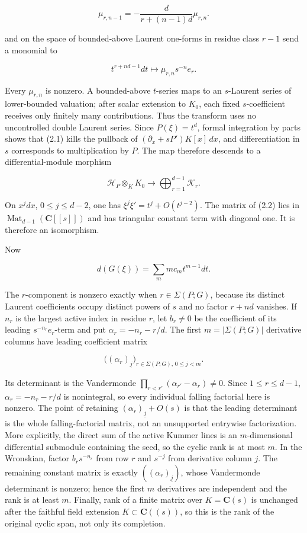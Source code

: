 \documentclass[
  11pt,
  a4paper,
]{amsart}
\begin{document}
\[
\mu_{r,n-1}=-\frac d{r+(n-1)d}\mu_{r,n}.
\]

and on the space of bounded-above Laurent one-forms in residue class
\(r-1\) send a monomial to

\[
t^{r+nd-1}dt\longmapsto\mu_{r,n}s^{-n}e_r.              \tag{2.1}
\]

Every \(\mu_{r,n}\) is nonzero. A bounded-above \(t\)-series maps to an
\(s\)-Laurent series of lower-bounded valuation; after scalar extension
to \(K_0\), each fixed \(s\)-coefficient receives only finitely many
contributions. Thus the transform uses no uncontrolled double Laurent
series. Since \(P(\xi)=t^d\), formal integration by parts shows that
(2.1) kills the pullback of \((\partial_x+sP')K[x]\,dx\), and
differentiation in \(s\) corresponds to multiplication by \(P\). The map
therefore descends to a differential-module morphism

\[
\mathcal H_P\otimes_KK_0
\longrightarrow\bigoplus_{r=1}^{d-1}\mathcal K_r.       \tag{2.2}
\]

On \(x^jdx\), \(0\le j\le d-2\), one has \(\xi^j\xi'=t^j+O(t^{j-2})\).
The matrix of (2.2) lies in \(\operatorname{Mat}_{d-1}(\mathbf C[[s]])\)
and has triangular constant term with diagonal one. It is therefore an
isomorphism.

Now

\[
d(G(\xi))=\sum_m m c_mt^{m-1}dt.
\]

The \(r\)-component is nonzero exactly when \(r\in\Sigma(P;G)\), because
its distinct Laurent coefficients occupy distinct powers of \(s\) and no
factor \(r+nd\) vanishes. If \(n_r\) is the largest active index in
residue \(r\), let \(b_r\ne0\) be the coefficient of its leading
\(s^{-n_r}e_r\)-term and put \(\alpha_r=-n_r-r/d\). The first
\(m=|\Sigma(P;G)|\) derivative columns have leading coefficient matrix

\[
\bigl((\alpha_r)_{\underline j}\bigr)_{
 r\in\Sigma(P;G),\,0\le j<m}.
\]

Its determinant is the Vandermonde
\(\prod_{r<r'}(\alpha_{r'}-\alpha_r)\ne0\). Since \(1\le r\le d-1\),
\(\alpha_r=-n_r-r/d\) is nonintegral, so every individual falling
factorial here is nonzero. The point of retaining
\((\alpha_r)_{\underline j}+O(s)\) is that the leading determinant is
the whole falling-factorial matrix, not an unsupported entrywise
factorization. More explicitly, the direct sum of the active Kummer
lines is an \(m\)-dimensional differential submodule containing the
seed, so the cyclic rank is at most \(m\). In the Wronskian, factor
\(b_rs^{-n_r}\) from row \(r\) and \(s^{-j}\) from derivative column
\(j\). The remaining constant matrix is exactly
\(((\alpha_r)_{\underline j})\), whose Vandermonde determinant is
nonzero; hence the first \(m\) derivatives are independent and the rank
is at least \(m\). Finally, rank of a finite matrix over
\(K=\mathbf C(s)\) is unchanged after the faithful field extension
\(K\subset\mathbf C((s))\), so this is the rank of the original cyclic
span, not only its completion.
\end{document}
